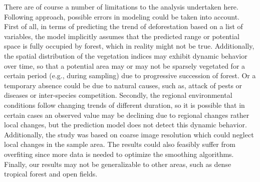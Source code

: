 There are of course a number of limitations to the analysis undertaken here. Following \citet{murase_2009} approach, possible errors in modeling could be taken into account. First of all, in terms of predicting the trend of deforestation based on a list of variables, the model implicitly assumes that the predicted range or potential space is fully occupied by forest, which in reality might not be true.  Additionally, the spatial distribution of the vegetation indices may exhibit dynamic behavior over time, so that a potential area may or may not be sparsely vegetated for a certain period (e.g., during sampling) due to progressive succession of forest. Or a temporary absence could be due to natural causes, such as, attack of pests or diseases or inter-species competition. Secondly, the regional environmental conditions follow changing trends of different duration, so it is possible that in certain cases an observed value may be declining due to regional changes rather local changes, but the prediction model does not detect this dynamic behavior. Additionally, the study was based on coarse image resolution which could neglect local changes in the sample area. The results could also feasibly suffer from overfiting since more data is needed to optimize the smoothing algorithms. Finally, our results may not  be generalizable  to  other areas, such as dense tropical forest and open fields.


\let\cleardoublepage\clearpage
\begin{appendices} 
\renewcommand{\thechapter}{A.\arabic{chapter}}\label{appendix2}

\end{appendices}
